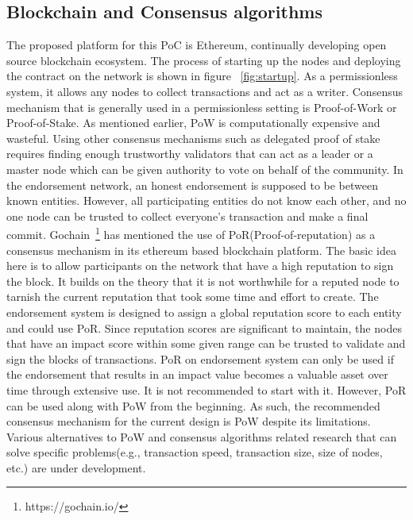 \subsection{Blockchain and Consensus algorithms}\label{subsec:bcConsensus}
The proposed platform for this PoC is Ethereum, continually developing open
source blockchain ecosystem. The process of starting up the nodes and deploying
the contract on the network is shown in figure ~\ref{fig:startup}. 
As a permissionless system, it allows any nodes to collect transactions and act
as a writer. Consensus mechanism that is generally used in a permissionless
setting is Proof-of-Work or Proof-of-Stake. As mentioned earlier, PoW is
computationally expensive and wasteful. Using other consensus mechanisms such
as delegated proof of stake requires finding enough trustworthy validators that
can act as a leader or a master node which can be given authority to vote on
behalf of the community. In the endorsement network, an honest endorsement is
supposed to be between known entities. However, all participating entities do
not know each other, and no one node can be trusted to collect everyone's
transaction and make a final commit. Gochain~\footnote{https://gochain.io/} has
mentioned the use of PoR(Proof-of-reputation) as a consensus mechanism in its
ethereum based blockchain platform. The basic idea here is to allow
participants on the network that have a high reputation to sign the block. It
builds on the theory that it is not worthwhile for a reputed node to tarnish
the current reputation that took some time and effort to create. The
endorsement system is designed to assign a global reputation score to each
entity and could use PoR. Since reputation scores are significant to maintain,
the nodes that have an impact score within some given range can be trusted to
validate and sign the blocks of transactions. PoR on endorsement system can
only be used if the endorsement that results in an impact value becomes a
valuable asset over time through extensive use. It is not recommended to start
with it. However, PoR can be used along with PoW from the beginning. As such,
the recommended consensus mechanism for the current design is PoW despite its
limitations. Various alternatives to PoW and consensus algorithms related
research that can solve specific problems(e.g., transaction speed, transaction
size, size of nodes, etc.) are under development. 

